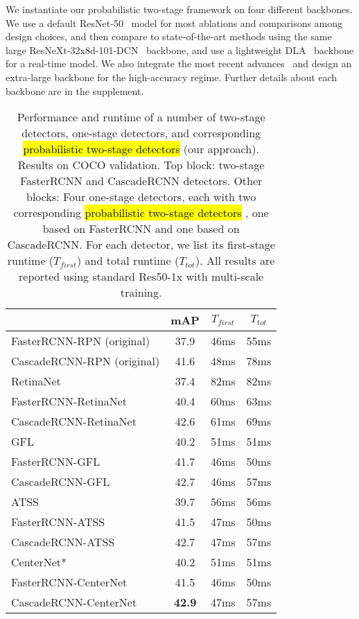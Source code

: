 \documentclass{article}
\newcommand{\ctext}[3][RGB]{\begingroup
  \definecolor{hlcolor}{#1}{#2}\sethlcolor{hlcolor}\hl{#3}\endgroup
}
\begin{document}
We instantiate our probabilistic two-stage framework on four different backbones.
We use a default ResNet-50~\cite{he2016deep} model for most ablations and comparisons among design choices, and then compare to state-of-the-art methods using the same large ResNeXt-32x8d-101-DCN~\cite{xie2017aggregated} backbone, and use a lightweight DLA~\cite{yu2018deep} backbone for a real-time model.
We also integrate the most recent advances~\cite{zoph2020rethinking,tan2020efficientdet,gao2019res2net} and design an extra-large backbone for the high-accuracy regime.
Further details about each backbone are in the supplement.


{
\begin{table}[t]
\centering
\begin{tabular}{l@{\ \ }c@{\ \ \ \ }c@{\ \ \ \ }c}
\toprule
& mAP & $T_{first}$ & $T_{tot}$ \\
\midrule
FasterRCNN-RPN (original) & 37.9 & 46ms & 55ms \\
CascadeRCNN-RPN (original) & 41.6 & 48ms & 78ms \\
\midrule
RetinaNet~\cite{lin2018focal} & 37.4 & 82ms & 82ms \\
\rowcolor{lightgray}
FasterRCNN-RetinaNet & 40.4 & 60ms & 63ms \\
\rowcolor{lightgray}
CascadeRCNN-RetinaNet & 42.6 & 61ms & 69ms \\
\midrule
GFL~\cite{li2020generalized} & 40.2 & 51ms & 51ms\\
\rowcolor{lightgray}
FasterRCNN-GFL & 41.7 & 46ms & 50ms \\
\rowcolor{lightgray}
CascadeRCNN-GFL & 42.7 & 46ms & 57ms \\
\midrule
ATSS~\cite{zhang2020bridging} & 39.7 & 56ms & 56ms\\
\rowcolor{lightgray}
FasterRCNN-ATSS & 41.5 & 47ms & 50ms \\
\rowcolor{lightgray}
CascadeRCNN-ATSS & 42.7 & 47ms & 57ms \\
\midrule
CenterNet* & 40.2 & 51ms & 51ms\\
\rowcolor{lightgray}
FasterRCNN-CenterNet & 41.5 & 46ms & 50ms \\
\rowcolor{lightgray}
CascadeRCNN-CenterNet & \textbf{42.9} & 47ms & 57ms\\
\bottomrule
\end{tabular}
\vspace{-2mm}
\caption{Performance and runtime of a number of two-stage detectors, one-stage detectors, and corresponding \ctext[RGB]{238,238,236}{probabilistic two-stage detectors} (our approach). Results on COCO validation.
Top block: two-stage FasterRCNN and CascadeRCNN detectors.
Other blocks: Four one-stage detectors, each with two corresponding \ctext[RGB]{238,238,236}{probabilistic two-stage detectors}, one based on FasterRCNN and one based on CascadeRCNN.
For each detector, we list its first-stage runtime ($T_{first}$) and total runtime ($T_{tot}$).
All results are reported using standard Res50-1x with multi-scale training.
}
\label{table:rpn}
\vspace{-5mm}
\end{table}
}
\end{document}
